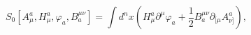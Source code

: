 \begin{equation}
S_{0}\left[ A_{\mu }^{a},H_{\mu }^{a},\varphi _{a},B_{a}^{\mu \nu }\right]
=\int d^{n}x\left( H_{\mu }^{a}\partial ^{\mu }\varphi _{a}+\frac{1}{2}%
B_{a}^{\mu \nu }\partial _{[\mu }A_{\nu ]}^{a}\right) ,  \label{f1}
\end{equation}

